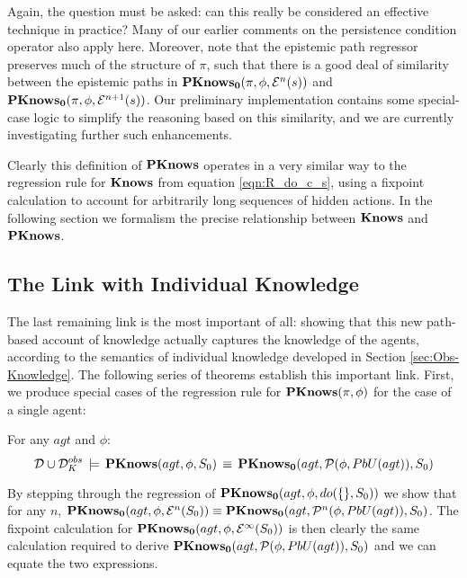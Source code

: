 Again, the question must be asked: can this really be considered an
effective technique in practice? Many of our earlier comments on the
persistence condition operator also apply here. Moreover, note that
the epistemic path regressor preserves much of the structure of $\pi$,
such that there is a good deal of similarity between the epistemic
paths in $\mathbf{PKnows_{0}}(\pi,\phi,\mathcal{E}^{n}(s))$ and $\mathbf{PKnows_{0}}(\pi,\phi,\mathcal{E}^{n+1}(s))$.
Our preliminary implementation contains some special-case logic to
simplify the reasoning based on this similarity, and we are currently
investigating further such enhancements. 

Clearly this definition of $\mathbf{PKnows}$ operates in a very similar way
to the regression rule for $\mathbf{Knows}$ from equation \eqref{eqn:R_do_c_s},
using a fixpoint calculation to account for arbitrarily long sequences
of hidden actions.  In the following section we formalism the precise
relationship between $\mathbf{Knows}$ and $\mathbf{PKnows}$.


\subsection{The Link with Individual Knowledge\label{sub:The-Link-with-IK}}

The last remaining link is the most important of all: showing that
this new path-based account of knowledge actually captures the knowledge
of the agents, according to the semantics of individual knowledge
developed in Section \ref{sec:Obs-Knowledge}. The following series
of theorems establish this important link. First, we produce special
cases of the regression rule for $\mathbf{PKnows}(\pi,\phi)$ for the case
of a single agent:

\begin{thm}
\label{thm:Pknows_PbU_S0}For any $agt$ and $\phi$:\[
\mathcal{D}\cup\mathcal{D}_{K}^{obs}\,\models\,\mathbf{PKnows}(agt,\phi,S_{0})\,\equiv\,\mathbf{PKnows_{0}}(agt,\mathcal{P}(\phi,PbU(agt)),S_{0})\]

\end{thm}
\begin{proofsketch}
By stepping through the regression of $\mathbf{PKnows_{0}}(agt,\phi,do(\{\},S_{0}))$
we show that for any $n$, $\mathbf{PKnows_{0}}(agt,\phi,\mathcal{E}^{n}(S_{0}))\equiv\mathbf{PKnows_{0}}(agt,\mathcal{P}^{n}(\phi,PbU(agt)),S_{0})$.
The fixpoint calculation for $\mathbf{PKnows_{0}}(agt,\phi,\mathcal{E}^{\infty}(S_{0}))$
is then clearly the same calculation required to derive $\mathbf{PKnows_{0}}(agt,\mathcal{P}(\phi,PbU(agt)),S_{0})$
and we can equate the two expressions. 
\end{proofsketch}
\medskip{}



